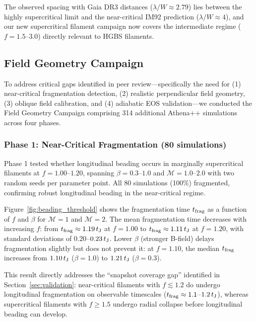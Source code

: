 \documentclass[twocolumn]{mnras}
\begin{document}
The observed spacing with Gaia DR3 distances ($\lambda/W \approx 2.79$) lies between the highly supercritical limit and the near-critical IM92 prediction ($\lambda/W \approx 4$), and our new supercritical filament campaign now covers the intermediate regime ($f = 1.5$--$3.0$) directly relevant to HGBS filaments.

\subsection{Field Geometry Campaign}
\label{sec:fieldgeo}

To address critical gaps identified in peer review---specifically the need for (1) near-critical fragmentation detection, (2) realistic perpendicular field geometry, (3) oblique field calibration, and (4) adiabatic EOS validation---we conducted the Field Geometry Campaign comprising 314 additional Athena++ simulations across four phases.

\subsubsection{Phase 1: Near-Critical Fragmentation (80 simulations)}

Phase 1 tested whether longitudinal beading occurs in marginally supercritical filaments at $f = 1.00$--$1.20$, spanning $\beta = 0.3$--$1.0$ and $\mathcal{M} = 1.0$--$2.0$ with two random seeds per parameter point. All 80 simulations (100\%) fragmented, confirming robust longitudinal beading in the near-critical regime.

Figure~\ref{fig:beading_threshold} shows the fragmentation time $t_{\rm frag}$ as a function of $f$ and $\beta$ for $\mathcal{M} = 1$ and $\mathcal{M} = 2$. The mean fragmentation time decreases with increasing $f$: from $t_{\rm frag} \approx 1.19\,t_{\rm J}$ at $f = 1.00$ to $t_{\rm frag} \approx 1.11\,t_{\rm J}$ at $f = 1.20$, with standard deviations of $0.20$--$0.23\,t_{\rm J}$. Lower $\beta$ (stronger B-field) delays fragmentation slightly but does not prevent it: at $f = 1.10$, the median $t_{\rm frag}$ increases from $1.10\,t_{\rm J}$ ($\beta = 1.0$) to $1.21\,t_{\rm J}$ ($\beta = 0.3$).

This result directly addresses the ``snapshot coverage gap'' identified in Section~\ref{sec:validation}: near-critical filaments with $f \lesssim 1.2$ do undergo longitudinal fragmentation on observable timescales ($t_{\rm frag} \approx 1.1$--$1.2\,t_{\rm J}$), whereas supercritical filaments with $f \geq 1.5$ undergo radial collapse before longitudinal beading can develop.
\end{document}
